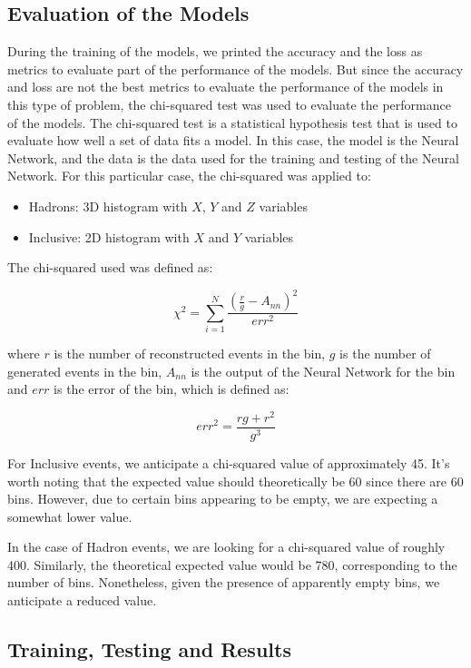 \documentclass[EPJ,twocolumn]{webofc}
\begin{document}
\subsection{Evaluation of the Models}

During the training of the models, we printed the accuracy and the loss as metrics to evaluate part of the performance of the models.
But since the accuracy and loss are not the best metrics to evaluate the performance of the models in this type of problem, the chi-squared test was used to evaluate the performance of the models.
The chi-squared test is a statistical hypothesis test that is used to evaluate how well a set of data fits a model. In this case, the model is the Neural Network, and the data is the data used for the training and testing of the Neural Network.
For this particular case, the chi-squared was applied to:
\begin{itemize}
    \item Hadrons: 3D histogram with $X$, $Y$ and $Z$ variables
    \item Inclusive: 2D histogram with $X$ and $Y$ variables
\end{itemize}

The chi-squared used was defined as:

\begin{equation}
    \chi^2 = \sum_{i=1}^{N} \frac{(\frac{r}{g} - A_{nn})^2}{err^2}
\end{equation}
    
where $r$ is the number of reconstructed events in the bin, $g$ is the number of generated events in the bin, $A_{nn}$ is the output of the Neural Network for the bin and $err$ is the error of the bin, which is defined as:

\begin{equation}
    err^2 = \frac{rg + r^2}{g^3}
\end{equation}

For Inclusive events, we anticipate a chi-squared value of approximately 45. It's worth noting that the expected value should theoretically be 60 since there are 60 bins. However, due to certain bins appearing to be empty, we are expecting a somewhat lower value.

In the case of Hadron events, we are looking for a chi-squared value of roughly 400. Similarly, the theoretical expected value would be 780, corresponding to the number of bins. Nonetheless, given the presence of apparently empty bins, we anticipate a reduced value.

\subsection{Training, Testing and Results}
\end{document}
